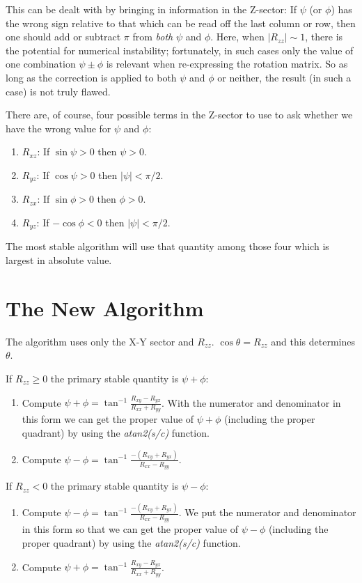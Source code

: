 \documentclass[twoside,12pt]{article}
\begin{document}
This can be dealt with by bringing in information in the Z-sector:
If $\psi$ (or $\phi$) has the wrong sign relative to that which can be read off
the last column or row, then one should add or subtract $\pi$ from {\em both} 
$\psi$ and $\phi$.
Here, when $|R_{zz}| \sim 1$, there is the potential for numerical instability;
fortunately, in such cases only the value of one combination $\psi \pm \phi$
is relevant when re-expressing the rotation matrix.  So as long as the
correction is applied to both $\psi$ and $\phi$ or neither, the result (in
such a case) is not truly flawed.

There are, of course, four possible terms in the Z-sector to use to ask whether
we have the wrong value for $\psi$ and $\phi$:
\begin{enumerate}
\item
$R_{xz}$: If $\sin \psi > 0$ then $\psi > 0$.
\item
$R_{yz}$: If $\cos \psi > 0$ then $|\psi| < \pi/2$.
\item
$R_{zx}$: If $\sin \phi > 0$ then $\phi > 0$.
\item
$R_{yz}$: If $-\cos \phi < 0$ then $|\psi| < \pi/2$.
\end{enumerate}

The most stable algorithm will use that quantity among those four which is
largest in absolute value.
 

\section{The New Algorithm}

The algorithm uses only the X-Y sector and $R_{zz}$.
$\cos \theta = R_{zz}$ and this determines $\theta$.
 
\noindent
If $ R_{zz} \geq 0$ the primary stable quantity is $\psi + \phi$:
\begin{enumerate}
\item
Compute $\psi + \phi = \tan^{-1} \frac{R_{xy} - R_{yx}}{R_{xx} + R_{yy}}$.
With the numerator and denominator in this form we can get the 
proper value of $\psi + \phi$ (including the proper quadrant) by using the
{\em atan2(s/c)} function.
\item
Compute $\psi - \phi = \tan^{-1} \frac{-(R_{xy} + R_{yx})}{R_{xx} - R_{yy}}$.
\end{enumerate}

\noindent
If $ R_{zz} < 0$ the primary stable quantity is $\psi - \phi$:
\begin{enumerate}
\item
Compute $\psi - \phi = \tan^{-1} \frac{-(R_{xy} + R_{yx})}{R_{xx} - R_{yy}}$.
We put the numerator and denominator in this form so that we can get the 
proper value of $\psi - \phi$ (including the proper quadrant) by using the
{\em atan2(s/c)} function.
\item
Compute $\psi + \phi = \tan^{-1} \frac{R_{xy} - R_{yx}}{R_{xx} + R_{yy}}$.
\end{enumerate}
\end{document}
